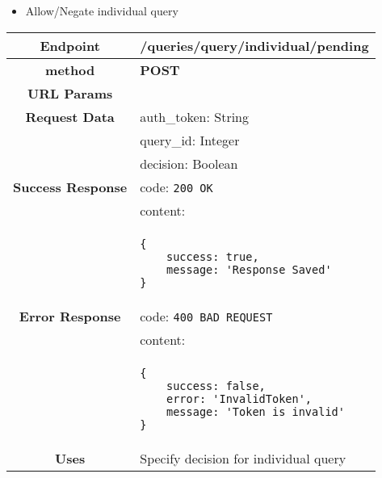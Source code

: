     \begin{itemize}
        \item Allow/Negate individual query
    \end{itemize}
    \begin{adjustwidth}{1cm}{}
        \begin{longtable}{|c|l|}
            \hline
            \textbf{Endpoint} & /queries/query/individual/pending \\
            \hline
            \textbf{method} & \textbf{POST} \\
            \hline
            \textbf{URL Params} &  \\
            \hline
            \textbf{Request Data} &  auth\_token: String \\
            & query\_id: Integer \\
            & decision: Boolean \\
            \hline
            \textbf{Success Response} & code: \texttt{200 OK} \\
            &                           content: \\
            & \begin{minipage}[t]{0.5\textwidth}
                \begin{adjustwidth}{1.5cm}{}
                \begin{verbatim}
{
    success: true, 
    message: 'Response Saved'
}
                \end{verbatim}
                \end{adjustwidth}
              \end{minipage} \\
              \hline
            \textbf{Error Response} & code: \texttt{400 BAD REQUEST} \\
              &                     content: \\
              & \begin{minipage}[t]{0.7\textwidth}
                \begin{adjustwidth}{1.5cm}{}
                \begin{verbatim}
{
    success: false, 
    error: 'InvalidToken',
    message: 'Token is invalid'
}
                \end{verbatim}
                \end{adjustwidth}
                 \vspace{4pt}
              \end{minipage} \\
              \hline
            \textbf{Uses} & Specify decision for individual query \\
            \hline
        \end{longtable}
    \end{adjustwidth}
    
